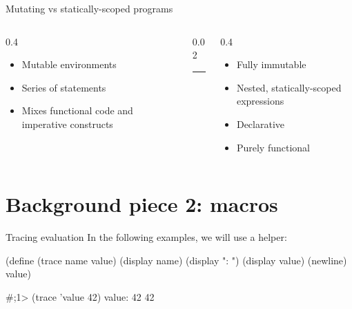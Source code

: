 \begin{frame}{Mutating vs statically-scoped programs}
\begin{columns}[T,onlytextwidth]
\begin{column}{0.4\textwidth}
\begin{itemize}
\item Mutable environments
\item Series of statements
\item Mixes functional code and imperative constructs
\end{itemize}
\end{column}
\begin{column}{0.02\textwidth}
\centering
\rule{0.4pt}{0.225\textheight}
\end{column}
\begin{column}{0.4\textwidth}
\begin{itemize}
\item Fully immutable
\item Nested, statically-scoped expressions
\item Declarative
\item Purely functional
\end{itemize}
\end{column}
\end{columns}
\end{frame}

\section{Background piece 2: macros}

\begin{frame}[fragile]{Tracing evaluation}
In the following examples, we will use a  helper:
\begin{listingbox}\begin{schemecode}
(define (trace name value)
  (display name)
  (display ": ")
  (display value)
  (newline)
  value)
\end{schemecode}\end{listingbox}
\begin{listingbox}\begin{schemerepl}
#;1> (trace 'value 42)
value: 42
42
\end{schemerepl}\end{listingbox}
\end{frame}

